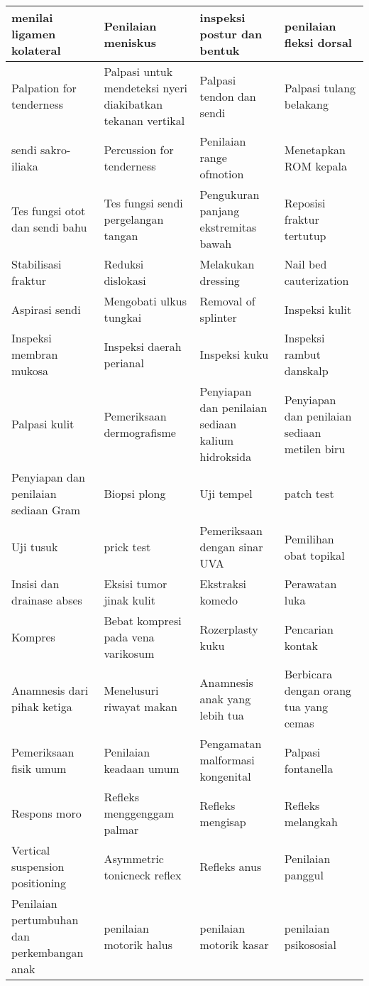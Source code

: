 {\begin{longtable}{|p{}|p{}|p{}|p{}|}
	menilai ligamen kolateral & Penilaian meniskus & inspeksi postur dan bentuk & penilaian fleksi dorsal \\ \hline
	Palpation for tenderness & Palpasi untuk mendeteksi nyeri diakibatkan tekanan vertikal & Palpasi tendon dan sendi & Palpasi tulang belakang \\ \hline
	sendi sakro-iliaka & Percussion for tenderness & Penilaian range ofmotion & Menetapkan ROM kepala \\ \hline
	Tes fungsi otot dan sendi bahu & Tes fungsi sendi pergelangan tangan & Pengukuran panjang ekstremitas bawah & Reposisi fraktur tertutup \\ \hline
	Stabilisasi fraktur & Reduksi dislokasi & Melakukan dressing & Nail bed cauterization \\ \hline
	Aspirasi sendi & Mengobati ulkus tungkai & Removal of splinter & Inspeksi kulit \\ \hline
	Inspeksi membran mukosa & Inspeksi daerah perianal & Inspeksi kuku & Inspeksi rambut danskalp \\ \hline
	Palpasi kulit & Pemeriksaan dermografisme & Penyiapan dan penilaian sediaan kalium hidroksida & Penyiapan dan penilaian sediaan metilen biru \\ \hline
	Penyiapan dan penilaian sediaan Gram & Biopsi plong & Uji tempel & patch test \\ \hline
	Uji tusuk & prick test & Pemeriksaan dengan sinar UVA & Pemilihan obat topikal \\ \hline
	Insisi dan drainase abses & Eksisi tumor jinak kulit & Ekstraksi komedo & Perawatan luka \\ \hline
	Kompres & Bebat kompresi pada vena varikosum & Rozerplasty kuku & Pencarian kontak \\ \hline
	Anamnesis dari pihak ketiga & Menelusuri riwayat makan & Anamnesis anak yang lebih tua & Berbicara dengan orang tua yang cemas \\ \hline
	Pemeriksaan fisik umum & Penilaian keadaan umum & Pengamatan malformasi kongenital & Palpasi fontanella \\ \hline
	Respons moro & Refleks menggenggam palmar & Refleks mengisap & Refleks melangkah \\ \hline
	Vertical suspension positioning & Asymmetric tonicneck reflex & Refleks anus & Penilaian panggul \\ \hline
	Penilaian pertumbuhan dan perkembangan anak & penilaian motorik halus & penilaian motorik kasar & penilaian psikososial \\ \hline

\end{longtable}}
